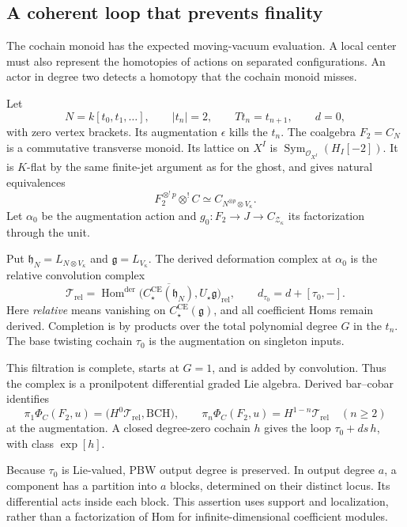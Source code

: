 \subsection{A coherent loop that prevents finality}

The cochain monoid has the expected moving-vacuum evaluation.
A local center must also represent the homotopies of actions
on separated configurations. An actor in degree two detects
a homotopy that the cochain monoid misses.

Let
\[
 N=k[t_0,t_1,\ldots],\qquad |t_n|=2,\qquad
 Tt_n=t_{n+1},\qquad d=0,
\]
with zero vertex brackets. Its augmentation $\epsilon$ kills
the $t_n$. The coalgebra $F_2=C_N$ is a commutative transverse
monoid. Its lattice on $X^I$ is
$\operatorname{Sym}_{\mathcal O_{X^I}}(H_I[-2])$.
It is $K$-flat by the same finite-jet argument as for the ghost,
and gives natural equivalences
\[
 F_2^{\otimes^!p}\otimes^!C
 \simeq C_{N^{\otimes p}\otimes V_\kappa}.
\]
Let $\alpha_0$ be the augmentation action and
$g_0:F_2\to J\to C_{\mathcal Z_\kappa}$ its factorization
through the unit.

Put $\mathfrak h_N=L_{N\otimes V_\kappa}$ and
$\mathfrak g=L_{V_\kappa}$. The derived deformation complex
at $\alpha_0$ is the relative convolution complex
\[
 \mathcal T_{\mathrm{rel}}=
 \operatorname{Hom}^{\mathrm{der}}
 \bigl(\overline{C^{\mathrm{CE}}_\star(\mathfrak h_N)},
       U_\star\mathfrak g\bigr)_{\mathrm{rel}},
 \qquad d_{\tau_0}=d+[\tau_0,-].
\]
Here \emph{relative} means vanishing on
$C^{\mathrm{CE}}_\star(\mathfrak g)$, and all coefficient
Homs remain derived. Completion is by products over the
total polynomial degree $G$ in the $t_n$. The base twisting
cochain $\tau_0$ is the augmentation on singleton inputs.

This filtration is complete, starts at $G=1$, and is added
by convolution. Thus the complex is a pronilpotent differential
graded Lie algebra. Derived bar--cobar identifies
\[
 \pi_1\Phi_C(F_2,u)=
 \bigl(H^0\mathcal T_{\mathrm{rel}},\mathrm{BCH}\bigr),
 \qquad
 \pi_n\Phi_C(F_2,u)=H^{1-n}\mathcal T_{\mathrm{rel}}
 \quad(n\geq2)
\]
at the augmentation. A closed degree-zero cochain $h$ gives
the loop $\tau_0+ds\,h$, with class $\exp[h]$.

Because $\tau_0$ is Lie-valued, PBW output degree is preserved.
In output degree $a$, a component has a partition into $a$
blocks, determined on their distinct locus. Its differential
acts inside each block. This assertion uses support and
localization, rather than a factorization of Hom for
infinite-dimensional coefficient modules.

